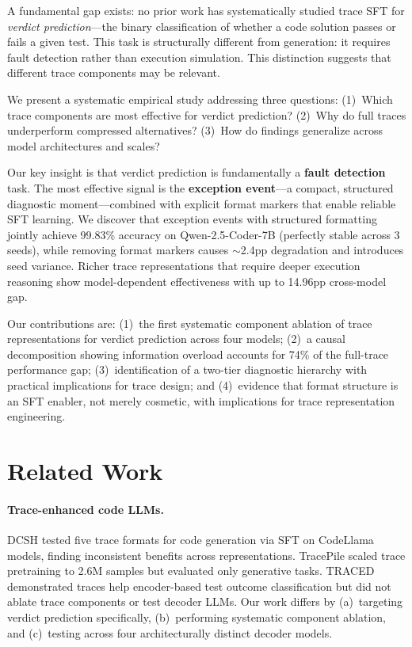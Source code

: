 \documentclass[11pt]{article}
\begin{document}
A fundamental gap exists: no prior work has systematically studied trace SFT for \emph{verdict prediction}---the binary classification of whether a code solution passes or fails a given test. This task is structurally different from generation: it requires fault detection rather than execution simulation. This distinction suggests that different trace components may be relevant.

We present a systematic empirical study addressing three questions: (1)~Which trace components are most effective for verdict prediction? (2)~Why do full traces underperform compressed alternatives? (3)~How do findings generalize across model architectures and scales?

Our key insight is that verdict prediction is fundamentally a \textbf{fault detection} task. The most effective signal is the \textbf{exception event}---a compact, structured diagnostic moment---combined with explicit format markers that enable reliable SFT learning. We discover that exception events with structured formatting jointly achieve 99.83\% accuracy on Qwen-2.5-Coder-7B (perfectly stable across 3 seeds), while removing format markers causes $\sim$2.4pp degradation and introduces seed variance. Richer trace representations that require deeper execution reasoning show model-dependent effectiveness with up to 14.96pp cross-model gap.

Our contributions are: (1)~the first systematic component ablation of trace representations for verdict prediction across four models; (2)~a causal decomposition showing information overload accounts for 74\% of the full-trace performance gap; (3)~identification of a two-tier diagnostic hierarchy with practical implications for trace design; and (4)~evidence that format structure is an SFT enabler, not merely cosmetic, with implications for trace representation engineering.

\section{Related Work}

\paragraph{Trace-enhanced code LLMs.} DCSH \citep{shi2024dcsh} tested five trace formats for code generation via SFT on CodeLlama models, finding inconsistent benefits across representations. TracePile \citep{wang2024tracepile} scaled trace pretraining to 2.6M samples but evaluated only generative tasks. TRACED \citep{ni2024traced} demonstrated traces help encoder-based test outcome classification but did not ablate trace components or test decoder LLMs. Our work differs by (a)~targeting verdict prediction specifically, (b)~performing systematic component ablation, and (c)~testing across four architecturally distinct decoder models.
\end{document}
